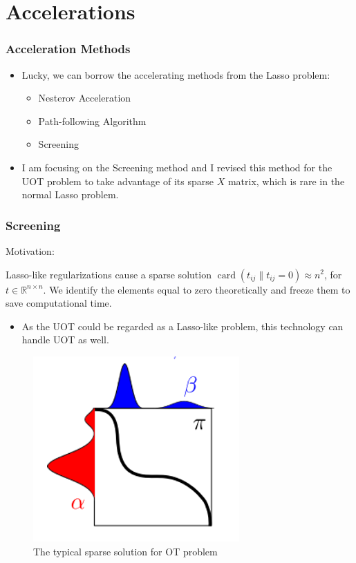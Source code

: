 \documentclass[dvipdfmx,cjk,t,10pt]{beamer}
\begin{document}
\section{Accelerations}
\begin{frame}
\frametitle{Acceleration Methods}
		\begin{itemize}
		\item   Lucky, we can borrow the accelerating methods from the Lasso problem:
		\begin{itemize}
		\item  Nesterov Acceleration
		\item  Path-following Algorithm \cite{Tibshirani_2011}
		\item  Screening \cite{ghaoui2010safe}
	   	\end{itemize}
	   	\item  I am focusing on the Screening method and I revised this method for the UOT problem to take advantage of its sparse $X$ matrix, which is rare in the normal Lasso problem. 

	   	\end{itemize}

\end{frame}





\begin{frame}
\frametitle{Screening}
	\begin{screen}{Motivation:}
	
	\quad Lasso-like regularizations cause a sparse solution $\operatorname{card}(t_{ij}\|t_{ij} = 0)\approx n^2$, for $t \in \mathbb{R}^{n \times n}$. We identify the elements equal to zero theoretically and freeze them to save computational time.
	
	\end{screen}	
		\begin{itemize}
		\item As the UOT could be regarded as a Lasso-like problem, this technology can handle UOT as well.
	   	\end{itemize}
	\begin{figure}[htbp]
	\begin{center}	
	\includegraphics[width=0.3\hsize]{pic/sparse}
	\caption{The typical sparse solution for OT problem}
	\end{center}	
	\end{figure}	
	
\end{frame}
\end{document}
